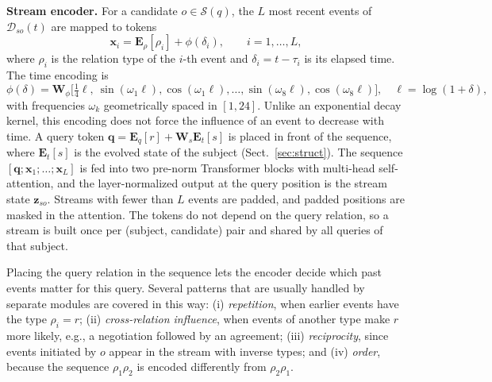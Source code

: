 \documentclass[runningheads]{llncs}
\newcommand{\para}[1]{\smallskip\noindent\textbf{#1}}
\begin{document}
\para{Stream encoder.} For a candidate $o \in \mathcal{S}(q)$, the $L$ most recent events of $\mathcal{D}_{so}(t)$ are mapped to tokens
\begin{equation}
  \mathbf{x}_i = \mathbf{E}_\rho[\rho_i] + \phi(\delta_i), \qquad i = 1, \dots, L,
\end{equation}
where $\rho_i$ is the relation type of the $i$-th event and $\delta_i = t - \tau_i$ is its elapsed time. The time encoding is
\begin{equation}
  \phi(\delta) = \mathbf{W}_\phi \big[\tfrac{1}{4}\ell,\ \sin(\omega_1 \ell), \cos(\omega_1 \ell), \dots, \sin(\omega_8 \ell), \cos(\omega_8 \ell)\big], \quad \ell = \log(1 + \delta),
  \label{eq:time}
\end{equation}
with frequencies $\omega_k$ geometrically spaced in $[1, 24]$. Unlike an exponential decay kernel, this encoding does not force the influence of an event to decrease with time. A query token $\mathbf{q} = \mathbf{E}_q[r] + \mathbf{W}_s \mathbf{E}_t[s]$ is placed in front of the sequence, where $\mathbf{E}_t[s]$ is the evolved state of the subject (Sect.~\ref{sec:struct}). The sequence $[\mathbf{q}; \mathbf{x}_1; \dots; \mathbf{x}_L]$ is fed into two pre-norm Transformer blocks with multi-head self-attention, and the layer-normalized output at the query position is the stream state $\mathbf{z}_{so}$. Streams with fewer than $L$ events are padded, and padded positions are masked in the attention. The tokens do not depend on the query relation, so a stream is built once per (subject, candidate) pair and shared by all queries of that subject.

Placing the query relation in the sequence lets the encoder decide which past events matter for this query. Several patterns that are usually handled by separate modules are covered in this way: (i) \emph{repetition}, when earlier events have the type $\rho_i = r$; (ii) \emph{cross-relation influence}, when events of another type make $r$ more likely, e.g., a negotiation followed by an agreement; (iii) \emph{reciprocity}, since events initiated by $o$ appear in the stream with inverse types; and (iv) \emph{order}, because the sequence $\rho_1 \rho_2$ is encoded differently from $\rho_2 \rho_1$.
\end{document}
